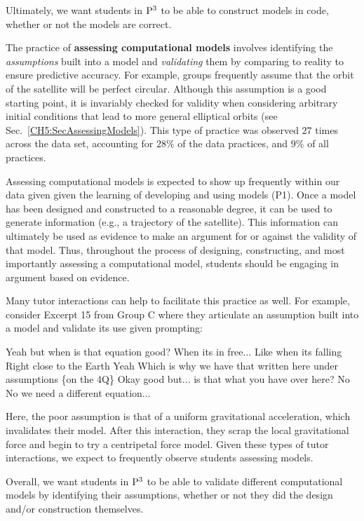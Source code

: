\documentclass{msuphddissertation}
\begin{document}
\begin{doublespace}
Ultimately, we want students in ${\rm P}^{3}$ to be able to construct models in code, whether or not the models are correct.

%
%
%

The practice of \textbf{assessing computational models} involves identifying the \textit{assumptions} built into a model and \textit{validating} them by comparing to reality to ensure predictive accuracy.  For example, groups frequently assume that the orbit of the satellite will be perfect circular.  Although this assumption is a good starting point, it is invariably checked for validity when considering arbitrary initial conditions that lead to more general elliptical orbits (see Sec.~\ref{CH5:SecAssessingModels}).  This type of practice was observed $27$ times across the data set, accounting for $28\%$ of the data practices, and $9\%$ of all practices.

Assessing computational models is expected to show up frequently within our data given given the learning of developing and using models (P1).  Once a model has been designed and constructed to a reasonable degree, it can be used to generate information (e.g., a trajectory of the satellite).  This information can ultimately be used as evidence to make an argument for or against the validity of that model.  Thus, throughout the process of designing, constructing, and most importantly assessing a computational model, students should be engaging in argument based on evidence.

Many tutor interactions can help to facilitate this practice as well.  For example, consider Excerpt 15 from Group C where they articulate an assumption built into a model and validate its use given prompting: \begin{description}
\TA Yeah but when is that equation good?
\SB When its in free...
\SC Like when its falling
\TA Right close to the Earth
\SB Yeah
\SC Which is why we have that written here under assumptions \{on the 4Q\}
\TA Okay good but... is that what you have over here?
\SB No
\SC No we need a different equation...
\end{description}  Here, the poor assumption is that of a uniform gravitational acceleration, which invalidates their model.  After this interaction, they scrap the local gravitational force and begin to try a centripetal force model.  Given these types of tutor interactions, we expect to frequently observe students assessing models.

Overall, we want students in ${\rm P}^{3}$ to be able to validate different computational models by identifying their assumptions, whether or not they did the design and/or construction themselves.


\end{doublespace}
\end{document}
